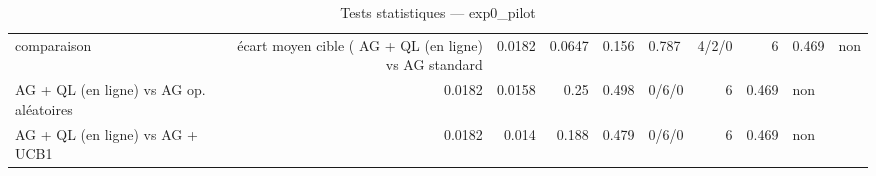 \begin{table}
\caption{Tests statistiques — exp0_pilot}
\label{tab:tests-exp0_pilot}
\begin{tabular}{lrrrrlrrl}
\toprule
comparaison & écart moyen cible (%
\midrule
AG + QL (en ligne) vs AG standard & 0.0182 & 0.0647 & 0.156 & 0.787 & 4/2/0 & 6 & 0.469 & non \\
AG + QL (en ligne) vs AG op. aléatoires & 0.0182 & 0.0158 & 0.25 & 0.498 & 0/6/0 & 6 & 0.469 & non \\
AG + QL (en ligne) vs AG + UCB1 & 0.0182 & 0.014 & 0.188 & 0.479 & 0/6/0 & 6 & 0.469 & non \\
\bottomrule
\end{tabular}
\end{table}

